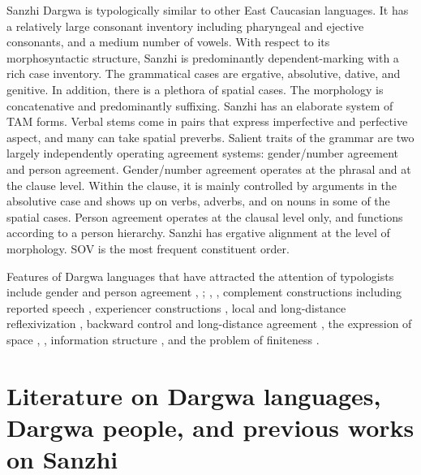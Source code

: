 Sanzhi Dargwa is typologically similar to other East Caucasian languages. It has a relatively large consonant inventory including pharyngeal and ejective consonants, and a medium number of vowels. With respect to its morphosyntactic structure, Sanzhi is predominantly dependent-marking with a rich case inventory. The grammatical cases are ergative, absolutive, dative, and genitive. In addition, there is a plethora of spatial cases. The morphology is concatenative and predominantly suffixing. Sanzhi has an elaborate system of TAM forms. Verbal stems come in pairs that express imperfective and perfective aspect, and many can take spatial preverbs. Salient traits of the grammar are two largely independently operating agreement systems: gender/number agreement and person agreement. Gender/number agreement operates at the phrasal and at the clause level. Within the clause, it is mainly controlled by arguments in the absolutive case and shows up on verbs, adverbs, and on nouns in some of the spatial cases. Person agreement operates at the clausal level only, and functions according to a person hierarchy. Sanzhi has ergative alignment at the level of morphology. SOV is the most frequent constituent order.

Features of Dargwa languages that have attracted the attention of typologists include gender and person agreement \citep{Sumbatova2011, Sumbatova2013}, \citep{Belyaev2013, Belyaev2017a, Belyaev2017b}; \citep{GanenkovForthcoming}, \citep{Forker2016a}, complement constructions including reported speech \citep{Ganenkov2012, ForkerSubmittedb}, experiencer constructions \citep{Comrie.vandenBerg2006, Ganenkov2006, Ganenkov2013}, local and long-distance reflexivization \citep{Forker2014}, backward control and long-distance agreement \citep{Serdobolskaya2009, Serdobolskaya2010, Belyaev2016}, the expression of space \citep{Ganenkov2010}, \citep{ForkerLTSanzhi}, information structure \citep{Sumbatova2009, Forker.Belyaev2016, Forker2016a}, and the problem of finiteness \citep{Kalinina.Sumbatova2007}.



\section[Literature and previous works]{Literature on Dargwa languages, Dargwa people, and previous works on Sanzhi}
\label{sec:Literature on Dargwa languages, Dargwa people, and previous works on Sanzhi}


